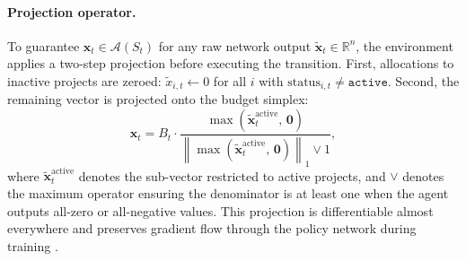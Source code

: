 \paragraph{Projection operator.}
To guarantee $\mathbf{x}_t \in \mathcal{A}(S_t)$ for any raw
network output $\tilde{\mathbf{x}}_t \in \mathbb{R}^n$, the
environment applies a two-step projection before executing the
transition. First, allocations to inactive projects are zeroed:
$\tilde{x}_{i,t} \leftarrow 0$ for all $i$ with
$\mathrm{status}_{i,t} \neq \texttt{active}$. Second, the remaining
vector is projected onto the budget simplex:
\begin{equation}
  \mathbf{x}_t = B_t \cdot
    \frac{\max(\tilde{\mathbf{x}}_t^{\mathrm{active}},\, \mathbf{0})}
         {\left\|\max(\tilde{\mathbf{x}}_t^{\mathrm{active}},\,
           \mathbf{0})\right\|_1 \vee 1},
  \label{eq:projection}
\end{equation}
where $\tilde{\mathbf{x}}_t^{\mathrm{active}}$ denotes the
sub-vector restricted to active projects, and $\vee$ denotes the
maximum operator ensuring the denominator is at least one when the
agent outputs all-zero or all-negative values. This projection is
differentiable almost everywhere and preserves gradient flow through
the policy network during training \citep{Schulman2017}.

